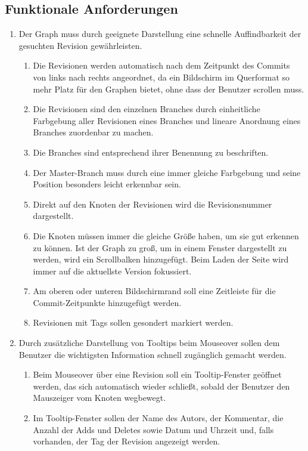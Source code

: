 \documentclass[nocolor]{tudbook}
\begin{document}
\subsection{Funktionale Anforderungen}
\begin{enumerate}[F1]
\item Der Graph muss durch geeignete Darstellung eine schnelle Auffindbarkeit der gesuchten Revision gewährleisten.
	\begin{enumerate}[{F1}.1]
	\item Die Revisionen werden automatisch nach dem Zeitpunkt des Commits von links nach rechts angeordnet, da ein Bildschirm im Querformat so mehr Platz für den Graphen bietet, ohne dass der Benutzer scrollen muss.
	\item Die Revisionen sind den einzelnen Branches durch einheitliche Farbgebung aller Revisionen eines Branches und lineare Anordnung eines Branches zuordenbar zu machen.
	\item Die Branches sind entsprechend ihrer Benennung zu beschriften.
	\item Der Master-Branch muss durch eine immer gleiche Farbgebung und seine Position besonders leicht erkennbar sein.
	\item Direkt auf den Knoten der Revisionen wird die Revisionsnummer dargestellt.
	\item Die Knoten müssen immer die gleiche Größe haben, um sie gut erkennen zu können. Ist der Graph zu groß, um in einem Fenster dargestellt zu werden, wird ein Scrollbalken hinzugefügt. Beim Laden der Seite wird immer auf die aktuellste Version fokussiert.
	\item Am oberen oder unteren Bildschirmrand soll eine Zeitleiste für die Commit-Zeitpunkte hinzugefügt werden.
	\item Revisionen mit Tags sollen gesondert markiert werden.
	\end{enumerate}
\item Durch zusätzliche Darstellung von Tooltips beim Mouseover sollen dem Benutzer die wichtigsten Information schnell zugänglich gemacht werden.
	\begin{enumerate}[{F2}.1]	
	\item Beim Mouseover über eine Revision soll ein Tooltip-Fenster geöffnet werden, das sich automatisch wieder schließt, sobald der Benutzer den Mauszeiger vom Knoten wegbewegt.
	\item Im Tooltip-Fenster sollen der Name des Autors, der Kommentar, die Anzahl der Adds und Deletes sowie Datum und Uhrzeit und, falls vorhanden, der Tag der Revision angezeigt werden.

\end{enumerate}
\end{enumerate}
\end{document}
